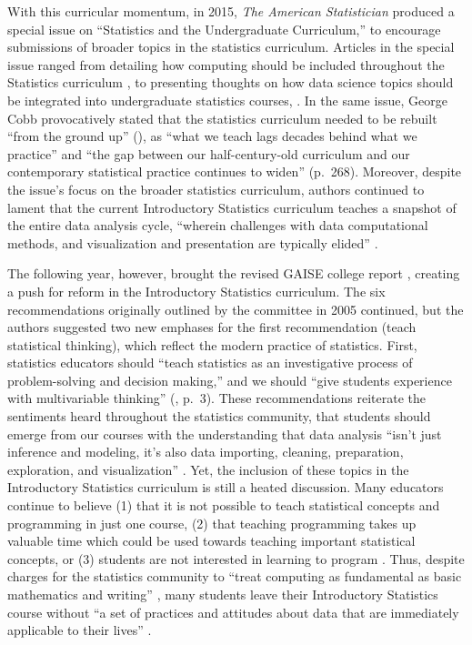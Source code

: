 \documentclass[12pt]{article}
\begin{document}
\quad With this curricular momentum, in 2015, \emph{The American Statistician} 
produced a special issue on ``Statistics and the Undergraduate Curriculum,'' to
encourage submissions of broader topics in the statistics curriculum. Articles 
in the special issue ranged from detailing how computing should be included 
throughout the Statistics curriculum \citep{jenny, tintle, hesterberg}, to 
presenting thoughts on how data science topics should be integrated into 
undergraduate statistics courses, \citep{esr, grimshaw, 
baumer_datascience, hardin}. In the same issue, George Cobb provocatively stated
that the statistics curriculum needed to be rebuilt ``from the ground up'' 
(\citeyear{cobb}), as ``what we teach lags decades behind what we practice'' and
``the gap between our half-century-old curriculum and our contemporary 
statistical practice continues to widen'' (p.\ 268). Moreover, despite the 
issue's focus on the broader statistics curriculum, authors continued to lament 
that the current Introductory Statistics curriculum teaches a snapshot of the 
entire data analysis cycle, ``wherein challenges with data computational 
methods, and visualization and presentation are typically elided'' 
\citep[p.\ 336]{baumer_datascience}. 

\quad The following year, however, brought the revised GAISE college report 
\citep{gaise}, creating a push for reform in the Introductory Statistics 
curriculum. The six recommendations originally outlined by the committee in 2005
continued, but the authors suggested two new emphases for the first
recommendation (teach statistical thinking), which reflect the modern practice
of statistics. First, statistics educators should ``teach statistics as an
investigative process of problem-solving and decision making,'' and we should 
``give students experience with multivariable thinking'' (\citeyear{gaise}, 
p.\ 3). These recommendations reiterate the sentiments heard throughout the
statistics community, that students should emerge from our courses with the
understanding that data analysis ``isn't just inference and modeling, it's also
data importing, cleaning, preparation, exploration, and visualization'' 
\citep{mine-jsm}. Yet, the inclusion of these topics in the Introductory 
Statistics curriculum is still a heated discussion. Many educators continue to 
believe (1) that it is not possible to teach statistical concepts and 
programming in just one course, (2) that teaching programming takes up valuable
time which could be used towards teaching important statistical concepts, or 
(3) students are not interested in learning to program \citep{mine-jsm}. Thus, 
despite charges for the statistics community to ``treat computing as fundamental
as basic mathematics and writing'' \citep[p.\ 298]{esr}, many students leave
their Introductory Statistics course without ``a set of practices and attitudes
about data that are immediately applicable to their lives'' 
\citep[p.\ 309]{gould}. 
\end{document}
